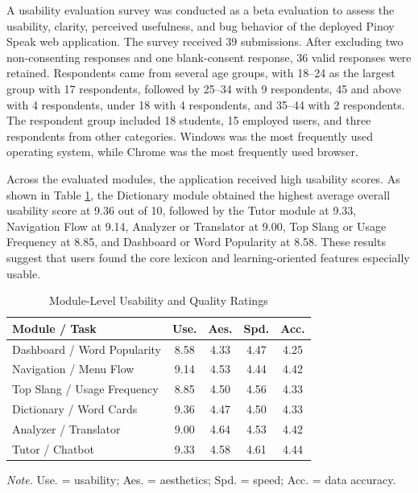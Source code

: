 A usability evaluation survey was conducted as a beta evaluation to assess the usability, clarity, perceived usefulness, and bug behavior of the deployed Pinoy Speak web application. The survey received 39 submissions. After excluding two non-consenting responses and one blank-consent response, 36 valid responses were retained. Respondents came from several age groups, with 18--24 as the largest group with 17 respondents, followed by 25--34 with 9 respondents, 45 and above with 4 respondents, under 18 with 4 respondents, and 35--44 with 2 respondents. The respondent group included 18 students, 15 employed users, and three respondents from other categories. Windows was the most frequently used operating system, while Chrome was the most frequently used browser.

Across the evaluated modules, the application received high usability scores. As shown in Table \ref{tab:module_ratings}, the Dictionary module obtained the highest average overall usability score at 9.36 out of 10, followed by the Tutor module at 9.33, Navigation Flow at 9.14, Analyzer or Translator at 9.00, Top Slang or Usage Frequency at 8.85, and Dashboard or Word Popularity at 8.58. These results suggest that users found the core lexicon and learning-oriented features especially usable.

\begin{table}[H]
\centering
\caption{Module-Level Usability and Quality Ratings}
\label{tab:module_ratings}
\small
\begin{tabular}{p{}cccc}
\toprule
\textbf{Module / Task} & \textbf{Use.} & \textbf{Aes.} & \textbf{Spd.} & \textbf{Acc.} \\
\midrule
Dashboard / Word Popularity & 8.58 & 4.33 & 4.47 & 4.25 \\
Navigation / Menu Flow & 9.14 & 4.53 & 4.44 & 4.42 \\
Top Slang / Usage Frequency & 8.85 & 4.50 & 4.56 & 4.33 \\
Dictionary / Word Cards & 9.36 & 4.47 & 4.50 & 4.33 \\
Analyzer / Translator & 9.00 & 4.64 & 4.53 & 4.42 \\
Tutor / Chatbot & 9.33 & 4.58 & 4.61 & 4.44 \\
\bottomrule
\end{tabular}

\vspace{0.5em}
\footnotesize{\textit{Note.} Use. = usability; Aes. = aesthetics; Spd. = speed; Acc. = data accuracy.}
\end{table}

